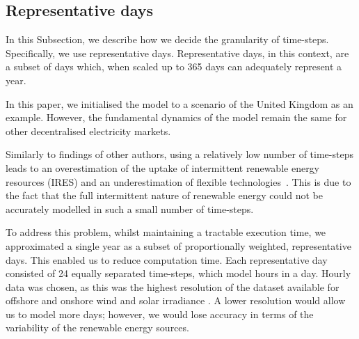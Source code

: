 
\subsection{Representative days}
\label{elecsim:sec:representative}


In this Subsection, we describe how we decide the granularity of time-steps. Specifically, we use representative days. Representative days, in this context, are a subset of days which, when scaled up to 365 days can adequately represent a year. 

In this paper, we initialised the model to a scenario of the United Kingdom as an example. However, the fundamental dynamics of the model remain the same for other decentralised electricity markets.






Similarly to findings of other authors, using a relatively low number of time-steps leads to an overestimation of the uptake of intermittent renewable energy resources (IRES) and an underestimation of flexible technologies~\cite{Ludig2011,Haydt2011}. This is due to the fact that the full intermittent nature of renewable energy could not be accurately modelled in such a small number of time-steps. 


To address this problem, whilst maintaining a tractable execution time, we approximated a single year as a subset of proportionally weighted, representative days. This enabled us to reduce computation time. Each representative day consisted of 24 equally separated time-steps, which model hours in a day. Hourly data was chosen, as this was the highest resolution of the dataset available for offshore and onshore wind and solar irradiance \cite{Pfenninger2016}. A lower resolution would allow us to model more days; however, we would lose accuracy in terms of the variability of the renewable energy sources. 


